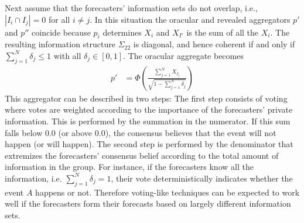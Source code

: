 \documentclass[11pt]{article}
\theoremstyle{definition}
\theoremstyle{definition}
\begin{document}
Next assume that the forecasters' information sets do not overlap, 
i.e., $|I_{i} \cap I_{j}| = 0$ for all $i \neq j$. 
In this situation the oracular and revealed aggregators $p'$ and $p''$
coincide because $p_i$ determines $X_i$ and $X_{I'}$ is the sum of
all the $X_i$.  The resulting information structure $\Sigma_{22}$ 
is diagonal, and hence coherent if and only if $\sum_{j=1}^N \delta_j \leq 1$ 
with all $\delta_j \in [0,1]$.  The oracular aggregate becomes
 \begin{align}
p' &= \Phi\left( \frac{\sum_{j=1}^N X_{I_j}}
  {\sqrt{1- \sum_{j=1}^N \delta_j}} \right) \label{vote}
\end{align}
This aggregator can be described in two steps: The first step consists of voting where votes are weighted according to the importance of the forecasters' private information. This is performed by the summation in the numerator. If this sum falls below $0.0$ (or above $0.0$), the consensus believes that the event will not happen (or will happen). The second step is performed by the denominator that extremizes the forecasters'  consensus belief according to the total amount of information in the group. For instance, if the forecasters know all the information, i.e. $\sum_{j=1}^N \delta_j = 1$, their vote deterministically indicates whether the event $A$ happens or not.  Therefore voting-like techniques can be expected to work well if the forecasters form their forecasts based on largely different information sets. 
\end{document}
